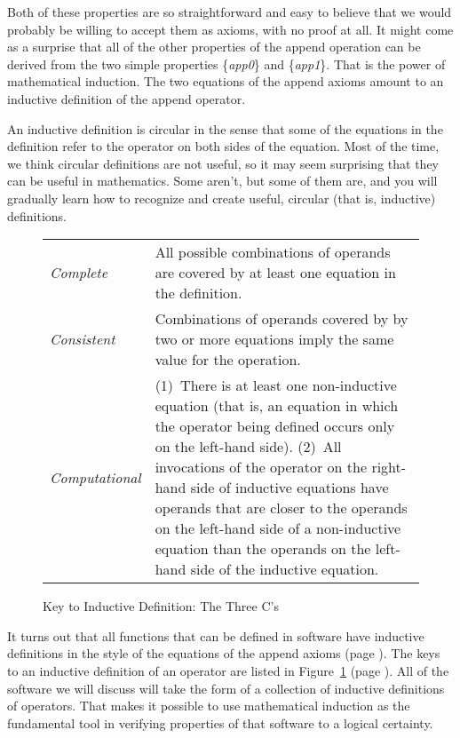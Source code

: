 Both of these properties are so straightforward and easy to believe 
that we would probably be willing to accept them as axioms, with no proof at all. 
It might come as a surprise that all of the other properties 
of the append operation can be derived from 
the two simple properties \{\emph{app0}\} and \{\emph{app1}\}. 
That is the power of mathematical induction. 
The two equations of the append axioms 
amount to an inductive definition of the append operator.

An inductive definition is circular in the sense 
that some of the equations in the definition refer 
to the operator on both sides of the equation. 
Most of the time, we think circular definitions are not useful, 
so it may seem surprising that they can be useful in mathematics. 
Some aren't, but some of them are, and you will 
gradually learn how to recognize and create useful, 
circular (that is, inductive) definitions.

\begin{figure}
\begin{center}
\begin{tabular}{lp{3.5in}}
\emph{Complete} & All possible combinations of operands are covered by at least one equation in the definition. \\
\emph{Consistent} & Combinations of operands covered by by two or more equations imply the same value for the operation. \\
\emph{Computational} & (1)~There is at least one non-inductive equation (that is, an equation in which the operator being defined
occurs only on the left-hand side). 
(2)~All invocations of the operator on the right-hand side of inductive equations 
have operands that are closer to the operands on the left-hand side of a non-inductive equation 
than the operands on the left-hand side of the inductive equation.
\end{tabular}
\caption{Key to Inductive Definition: The Three C's}
\end{center}
\label{fig:inductive-def-keys}
\end{figure}

It turns out that all functions that can be defined in software 
have inductive definitions in the style of the equations of the append axioms (page \pageref{append-equations}).
The keys to an inductive definition of an operator are listed in Figure~\ref{fig:inductive-def-keys}
(page \pageref{fig:inductive-def-keys}). All of the software we will discuss will take the form of a collection of inductive definitions of operators. That makes it possible to use mathematical induction as the fundamental tool in verifying properties of that software to a logical certainty.

